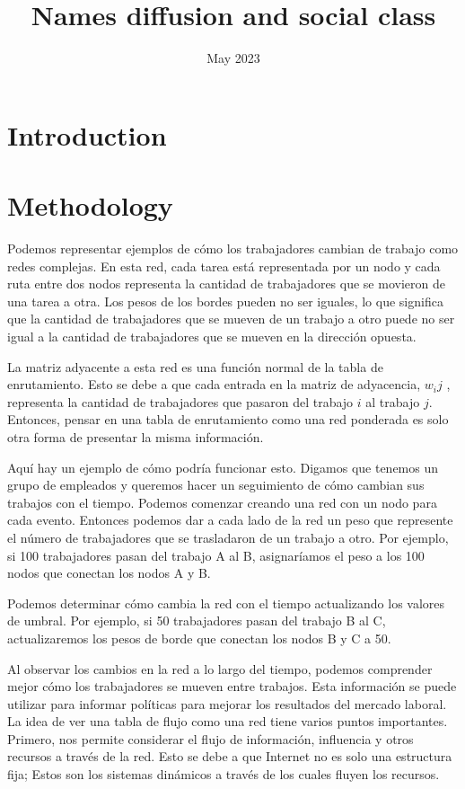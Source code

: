 \documentclass{article}
\title{Names diffusion and social class}
\author{}
\date{May 2023}
\begin{document}
\maketitle

\section{Introduction}

\section{Methodology}

Podemos representar ejemplos de cómo los trabajadores cambian de trabajo como redes complejas. En esta red, cada tarea está representada por un nodo y cada ruta entre dos nodos representa la cantidad de trabajadores que se movieron de una tarea a otra. Los pesos de los bordes pueden no ser iguales, lo que significa que la cantidad de trabajadores que se mueven de un trabajo a otro puede no ser igual a la cantidad de trabajadores que se mueven en la dirección opuesta.

La matriz adyacente a esta red es una función normal de la tabla de enrutamiento. Esto se debe a que cada entrada en la matriz de adyacencia, \(w_ij \)  , representa la cantidad de trabajadores que pasaron del trabajo \( i\) al trabajo \( j \). Entonces, pensar en una tabla de enrutamiento como una red ponderada es solo otra forma de presentar la misma información.

Aquí hay un ejemplo de cómo podría funcionar esto. Digamos que tenemos un grupo de empleados y queremos hacer un seguimiento de cómo cambian sus trabajos con el tiempo. Podemos comenzar creando una red con un nodo para cada evento. Entonces podemos dar a cada lado de la red un peso que represente el número de trabajadores que se trasladaron de un trabajo a otro. Por ejemplo, si 100 trabajadores pasan del trabajo A al B, asignaríamos el peso a los 100 nodos que conectan los nodos A y B.

Podemos determinar cómo cambia la red con el tiempo actualizando los valores de umbral. Por ejemplo, si 50 trabajadores pasan del trabajo B al C, actualizaremos los pesos de borde que conectan los nodos B y C a 50.

Al observar los cambios en la red a lo largo del tiempo, podemos comprender mejor cómo los trabajadores se mueven entre trabajos. Esta información se puede utilizar para informar políticas para mejorar los resultados del mercado laboral. La idea de ver una tabla de flujo como una red tiene varios puntos importantes. Primero, nos permite considerar el flujo de información, influencia y otros recursos a través de la red. Esto se debe a que Internet no es solo una estructura fija; Estos son los sistemas dinámicos a través de los cuales fluyen los recursos.
\end{document}
